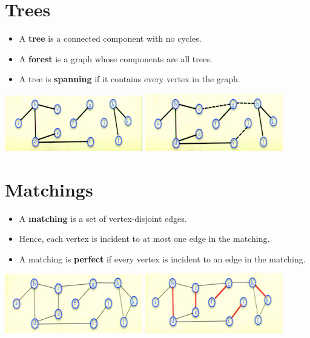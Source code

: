 \documentclass[12pt]{article}
\begin{document}
\section{Trees}
\renewcommand{\labelitemii}{$\circ$}
\renewcommand{\labelitemiii}{$\cdot$}
\renewcommand{\labelitemiii}{$\rightarrow$}
\renewcommand{\labelitemiv}{$\star$}
\begin{itemize}
\item A \textbf{tree} is a connected component with no cycles.
\item A \textbf{forest} is a graph whose components are all trees.
\item A tree is \textbf{spanning} if it contains every vertex in the graph.
\end{itemize}
\begin{center}
\includegraphics{lecture713}
\includegraphics{lecture714}
\end{center}

\section{Matchings}
\renewcommand{\labelitemii}{$\circ$}
\renewcommand{\labelitemiii}{$\cdot$}
\renewcommand{\labelitemiii}{$\rightarrow$}
\renewcommand{\labelitemiv}{$\star$}
\begin{itemize}
\item A \textbf{matching} is a set of vertex-disjoint edges.
\item Hence, each vertex is incident to at most one edge in the matching.
\item A matching is \textbf{perfect} if every vertex is incident to an edge in the matching.
\end{itemize}
\begin{center}
\includegraphics{lecture716}
\includegraphics{lecture715}
\end{center}
\end{document}
